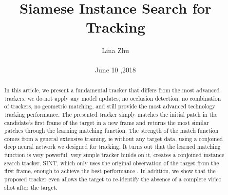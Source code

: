 \documentclass[10pt,twocolumn,letterpaper]{article}
\begin{document}
\title{Siamese Instance Search for Tracking}
\author{Lina Zhu\\\\June 10 ,2018}
\maketitle
\begin{abstract}
In this article, we present a fundamental tracker that differs from the most advanced trackers: we do not apply any model updates, no occlusion detection, no combination of trackers, no geometric matching, and still provide the most advanced technology tracking performance. The presented tracker simply matches the initial patch in the candidate's first frame of the target in a new frame and returns the most similar patches through the learning matching function. The strength of the match function comes from a general extensive training, ie without any target data, using a conjoined deep neural network we designed for tracking. It turns out that the learned matching function is very powerful, very simple tracker builds on it, creates a conjoined instance search tracker, SINT, which only uses the original observation of the target from the first frame, enough to achieve the best performance . In addition, we show that the proposed tracker even allows the target to re-identify the absence of a complete video shot after the target.
\end{abstract}
\end{document}
